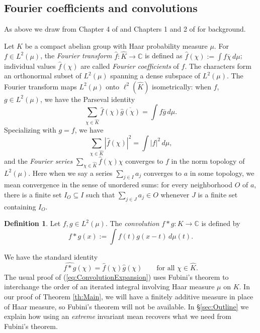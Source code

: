 \documentclass[12pt]{amsart} \usepackage{amsmath,centernot,amssymb,leftindex}
\numberwithin{theorem}{section}
\numberwithin{equation}{section}
\theoremstyle{definition}
\newtheorem{definition}[theorem]{Definition}
\begin{document}
\subsection{Fourier coefficients and convolutions}
As above we draw from Chapter 4 of \cite{Folland_CourseInAHA} and Chapters 1 and 2 of \cite{Rudin_Fourier} for background.	

Let $K$ be a compact abelian group with Haar probability measure $\mu$.   For $f\in L^{2}(\mu)$, the \emph{Fourier transform} $\hat{f}:\widehat{K}\to \mathbb C$ is defined as $\hat{f}(\chi):=\int f \overline{\chi} \, d\mu$; individual values $\hat{f}(\chi)$ are called \emph{Fourier coefficients} of $f$. The characters form an orthonormal subset of $L^2(\mu)$ spanning a dense subspace of $L^2(\mu)$.  The Fourier transform maps $L^{2}(\mu)$ onto $\ell^{2}(\widehat{K})$ isometrically: when $f$, $g\in L^{2}(\mu)$, we have the Parseval identity
\begin{equation}\label{eq:Parseval}
	\sum_{\chi\in\widehat{K}} \hat{f}(\chi)\overline{\hat{g}(\chi)} = \int f\bar{g}\, d\mu.
\end{equation}
Specializing with $g=f$, we have 
\begin{equation}\label{eq:Bessel}\sum_{\chi\in \widehat{K}}|\hat{f}(\chi)|^2=\int |f|^2\, d\mu,
\end{equation} and the \emph{Fourier series} $\sum_{\chi\in\widehat{K}} \hat{f}(\chi)\chi$ converges to $f$ in the norm topology of $L^2(\mu)$.  Here when we say a series $\sum_{j\in I} a_j$ converges to $a$ in some topology, we mean convergence in the sense of unordered sums: for every neighborhood $O$ of $a$, there is a finite set $I_O\subseteq I$ such that $\sum_{j\in J} a_j\in O$ whenever $J$ is a finite set containing $I_O$.

\begin{definition}
	Let $f, g \in L^2(\mu)$.  The \emph{convolution} $f*g:K\to \mathbb C$ is defined by
	\[
	f*g(x):=\int f(t)g(x-t)\, d\mu(t).
	\]
\end{definition}
We have the standard identity \cite[Theorem 1.2.4 (b)]{Rudin_Fourier}
\begin{equation}\label{eq:ConvolutionToMultiplication}
	\widehat{f*g}(\chi)=\hat{f}(\chi)\hat{g}(\chi) \qquad \text{for all } \chi\in\widehat{K}.
\end{equation}
The usual proof of (\ref{eq:ConvolutionExpansion}) uses Fubini's theorem to interchange the order of an iterated integral involving Haar measure $\mu$ on $K$.  In our proof of Theorem \ref{th:Main}, we will have a finitely additive measure in place of Haar measure, so Fubini's theorem will not be available.  In \S\ref{sec:Outline} we explain how using an \emph{extreme} invariant mean recovers what we need from Fubini's theorem.
\end{document}
